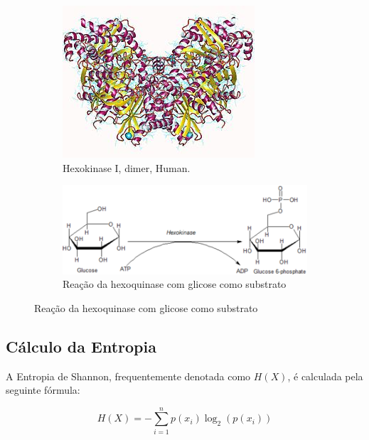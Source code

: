 \documentclass{article}
\begin{document}
\begin{figure}[h]
  \centering
  \begin{subfigure}{0.25\textwidth}
    \centering
    \includegraphics[width=\linewidth]{hexo1.jpg}
    \caption{\label{fig:hexo1.jpeg}Hexokinase I, dimer, Human.}
  \end{subfigure}\hspace{8em}
  \begin{subfigure}{0.25\textwidth}
    \centering
    \includegraphics[width=\linewidth]{hexo2.png}
    \caption{Reação da hexoquinase com glicose como substrato}
  \end{subfigure}
  \end{figure}
  

\subsection{Cálculo da Entropia}
A Entropia de Shannon, frequentemente denotada como \(H(X)\), é calculada pela seguinte fórmula:

\begin{equation}
H(X) = -\sum_{i=1}^{n} p(x_i) \log_2(p(x_i))
\end{equation}
\end{document}
